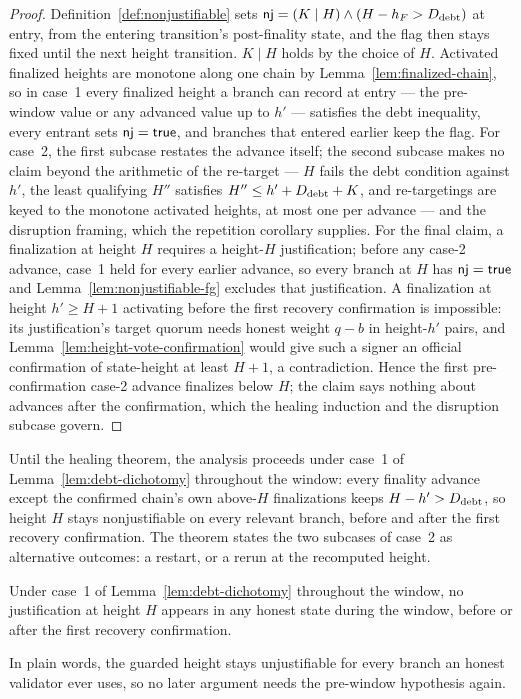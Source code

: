 \begin{proof}
Definition~\ref{def:nonjustifiable} sets
\(\mathsf{nj}=(K\mid H)\wedge(H-h_F>D_{\rm debt})\) at entry, from the entering
transition's post-finality state, and the flag then stays fixed until the
next height transition.  \(K\mid H\) holds by the choice of \(H\).
Activated finalized heights are monotone along one chain by
Lemma~\ref{lem:finalized-chain}, so in case~1 every finalized height a
branch can record at entry --- the pre-window value or any advanced value
up to \(h'\) --- satisfies the debt inequality, every entrant sets
\(\mathsf{nj}=\mathsf{true}\), and branches that entered earlier keep the
flag.  For case~2, the first subcase restates the advance itself; the
second subcase makes no claim beyond the arithmetic of the re-target ---
\(H\) fails the debt condition against \(h'\), the least qualifying
\(H''\) satisfies \(H''\leq h'+D_{\rm debt}+K\), and re-targetings are
keyed to the monotone activated heights, at most one per advance ---
and the disruption framing, which the repetition corollary supplies.
For the final claim, a
finalization at height \(H\) requires a height-\(H\) justification;
before any case-2 advance, case~1 held for every earlier advance, so
every branch at \(H\) has \(\mathsf{nj}=\mathsf{true}\) and
Lemma~\ref{lem:nonjustifiable-fg} excludes that justification.  A
finalization at height \(h'\geq H+1\) activating before the first
recovery confirmation is impossible: its justification's target quorum
needs honest weight \(q-b\) in
height-\(h'\) pairs, and
Lemma~\ref{lem:height-vote-confirmation} would give such a signer an
official confirmation of state-height at least \(H+1\), a
contradiction.  Hence the
first pre-confirmation case-2 advance finalizes below \(H\); the claim
says nothing about advances after the confirmation, which the healing
induction and the disruption subcase govern.
\end{proof}

Until the healing theorem, the analysis proceeds under case~1 of
Lemma~\ref{lem:debt-dichotomy} throughout the window: every finality
advance except the confirmed chain's own above-\(H\) finalizations
keeps \(H-h'>D_{\rm debt}\), so height
\(H\) stays nonjustifiable on every relevant branch, before and after
the first recovery confirmation.  The theorem
states the two subcases of case~2 as alternative outcomes: a restart, or
a rerun at the recomputed height.

\begin{lemma}
\label{lem:no-height-h-justification}
Under case~1 of Lemma~\ref{lem:debt-dichotomy} throughout the window, no
justification at height \(H\) appears in any honest state during the
window, before or after the first recovery confirmation.

In plain words, the guarded height stays unjustifiable for every branch an
honest validator ever uses, so no later argument needs the pre-window
hypothesis again.
\end{lemma}

